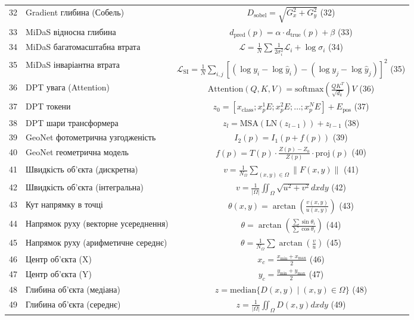 \documentclass[14pt, a4paper]{extarticle}
\numberwithin{equation}{section}
\begin{document}
\begin{longtable}{|c|p{10cm}|c|}
32 & Gradient глибина (Собель) & $D_{\text{sobel}} = \sqrt{G_x^2 + G_y^2}$ \hfill (32) \\
33 & MiDaS відносна глибина & $d_{\text{pred}}(p) = \alpha \cdot d_{\text{true}}(p) + \beta$ \hfill (33) \\
34 & MiDaS багатомасштабна втрата & $\mathcal{L} = \frac{1}{N} \sum \frac{1}{2\sigma_i^2} \mathcal{L}_i + \log \sigma_i$ \hfill (34) \\
35 & MiDaS інваріантна втрата & $\mathcal{L}_{\text{SI}} = \frac{1}{N} \sum_{i,j} [(\log y_i - \log \hat{y}_i) - (\log y_j - \log \hat{y}_j)]^2$ \hfill (35) \\
36 & DPT увага (Attention) & $\text{Attention}(Q,K,V) = \text{softmax}\left(\frac{QK^T}{\sqrt{d_k}}\right)V$ \hfill (36) \\
37 & DPT токени & $z_0 = [x_{\text{class}}; x_p^1 E; x_p^2 E; \ldots; x_p^N E] + E_{\text{pos}}$ \hfill (37) \\
38 & DPT шари трансформера & $z_l = \text{MSA}(\text{LN}(z_{l-1})) + z_{l-1}$ \hfill (38) \\
39 & GeoNet фотометрична узгодженість & $I_2(p) = I_1(p + f(p))$ \hfill (39) \\
40 & GeoNet геометрична модель & $f(p) = T(p) \cdot \frac{Z(p)-Z_0}{Z(p)} \cdot \text{proj}(p)$ \hfill (40) \\
41 & Швидкість об'єкта (дискретна) & $v = \frac{1}{N_\Omega} \sum_{(x,y)\in\Omega} \|F(x,y)\|$ \hfill (41) \\
42 & Швидкість об'єкта (інтегральна) & $v = \frac{1}{|\Omega|} \iint_{\Omega} \sqrt{u^2+v^2} dx dy$ \hfill (42) \\
43 & Кут напрямку в точці & $\theta(x,y) = \arctan\left(\frac{v(x,y)}{u(x,y)}\right)$ \hfill (43) \\
44 & Напрямок руху (векторне усереднення) & $\theta = \arctan\left(\frac{\sum \sin\theta_i}{\sum \cos\theta_i}\right)$ \hfill (44) \\
45 & Напрямок руху (арифметичне середнє) & $\theta = \frac{1}{N_\Omega} \sum \arctan\left(\frac{v}{u}\right)$ \hfill (45) \\
46 & Центр об'єкта (X) & $x_c = \frac{x_{\min} + x_{\max}}{2}$ \hfill (46) \\
47 & Центр об'єкта (Y) & $y_c = \frac{y_{\min} + y_{\max}}{2}$ \hfill (47) \\
48 & Глибина об'єкта (медіана) & $z = \text{median}\{D(x,y) \mid (x,y)\in\Omega\}$ \hfill (48) \\
49 & Глибина об'єкта (середнє) & $z = \frac{1}{|\Omega|} \iint_{\Omega} D(x,y) dx dy$ \hfill (49) \\

\end{longtable}
\end{document}
